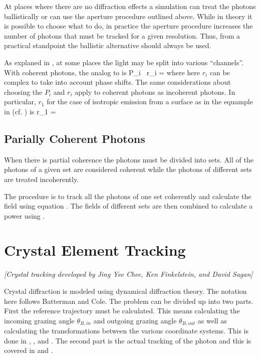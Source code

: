 At places where there are no diffraction effects a simulation can
treat the photons ballistically or can use the aperture procedure
outlined above. While in theory it is possible to choose what to do, in
practice the aperture procedure increases the number of photons that
must be tracked for a given resolution. Thus, from a practical standpoint
the ballistic alternative should always be used.

As explaned in , at some places the light may be split
into various ``channels''. With coherent photons, the analog to  is
\Begineq
  P_i \, r_i = 
  \label{rpss2}
\Endeq
where here $r_i$ can be complex to take into account phase shifts.
The same considerations about choosing the $P_i$ and $r_i$ apply to
coherent photons as incoherent photons. In particular, $r_1$ for the
case of isotropic emission from a surface as in the equample in
 (cf. ) is
\Begineq
  r_1 = 
\Endeq

\subsection{Parially Coherent Photons}

When there is partial coherence the photons must be divided into
sets. All of the photons of a given set are considered coherent while
the photons of different sets are treated incoherently.

The procedure is to track all the photons of one set coherently and
calculate the field using equation . The fields of
different sets are then combined to calculate a power using
.

\section{Crystal Element Tracking}
\label{s:crystal.tracking}

\textit{\large [Crystal tracking developed by Jing Yee Chee, Ken Finkelstein, and David Sagan]}

Crystal diffraction is modeled using dynamical diffraction theory. The
notation here follows Batterman and Cole\cite{b:batterman}.  The
problem can be divided up into two parts. First the reference
trajectory must be calculated. This means calculating the incoming
grazing angle $\theta_{B,in}$ and outgoing grazing angle
$\theta_{B,out}$ as well as calculating the transformations between
the various coordinate systems. This is done in ,
, and .  The second part
is the actual tracking of the photon and this is covered in
 and .

